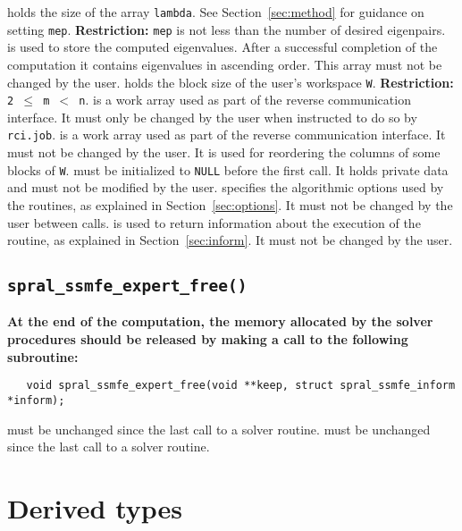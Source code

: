 \begin{description}
%
 holds the size of the array {\tt lambda}.
See Section~\ref{sec:method} for guidance on
setting {\tt mep}.
{\bf Restriction:} 
{\tt mep} is not less than the number of desired eigenpairs.
%
 is
used to store the computed eigenvalues.
After a successful completion of the computation
it contains eigenvalues in ascending order.
This array must not be changed by the user.
%
 holds the block size of the user's workspace {\tt W}. 
{\bf Restriction:} {\tt 2 $\le$ m $<$ n}.
%
 is a work array used as part of the reverse communication interface.
It must only be changed by the user when
instructed to do so by 
{\tt rci.job}.
%
 is a work array used as part of the reverse communication interface.
It must not be changed by the user.
It is used for reordering the columns of some blocks of {\tt W}.
%
 must be initialized to \texttt{NULL} before the first call.
It holds private data and must not be modified by the user.
%
 specifies the algorithmic options used by the routines,
as explained in Section~\ref{sec:options}.
It must not be changed by the user between calls.
%
 is used to return information about the execution of the
routine, as explained in Section~\ref{sec:inform}.
It must not be changed by the user.
%
\end{description}

\subsection{\texttt{spral\_ssmfe\_expert\_free()}}

{\bf
At the end of the computation, the memory 
allocated by the solver procedures
should be released
by making a call to the following subroutine:
}

\begin{verbatim}
   void spral_ssmfe_expert_free(void **keep, struct spral_ssmfe_inform *inform);
\end{verbatim}

\begin{description}
%
 must be unchanged since the last call to a solver routine.
%
  must be unchanged since the last call to a solver routine.
%
\end{description}

\section{Derived types}

